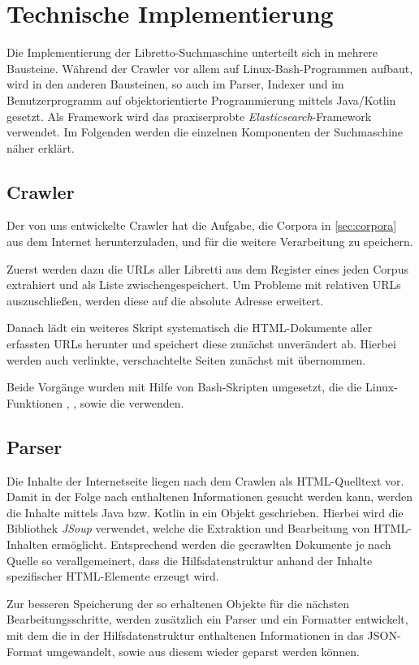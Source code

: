 \section{Technische Implementierung}
Die Implementierung der Libretto-Suchmaschine unterteilt sich
in mehrere Bausteine.
Während der Crawler vor allem auf Linux-Bash-Programmen aufbaut,
wird in den anderen Bausteinen, so auch im Parser, Indexer und im Benutzerprogramm
auf objektorientierte Programmierung mittels Java/Kotlin gesetzt.
Als Framework wird das praxiserprobte \emph{Elasticsearch}-Framework verwendet.
Im Folgenden werden die einzelnen Komponenten der Suchmaschine
näher erklärt.

\subsection{Crawler}
Der von uns entwickelte Crawler hat die Aufgabe,
die Corpora in \ref{sec:corpora} aus dem Internet herunterzuladen,
und für die weitere Verarbeitung zu speichern.

Zuerst werden dazu die URLs aller Libretti aus dem Register
eines jeden Corpus extrahiert und als Liste zwischengespeichert.
Um Probleme mit relativen URLs auszuschließen,
werden diese auf die absolute Adresse erweitert.

Danach lädt ein weiteres Skript systematisch die HTML-Dokumente
aller erfassten URLs herunter
und speichert diese zunächst unverändert ab.
Hierbei werden auch verlinkte, verschachtelte Seiten zunächst mit übernommen.

Beide Vorgänge wurden mit Hilfe von Bash-Skripten umgesetzt,
die die Linux-Funktionen , ,
sowie die  verwenden.

\subsection{Parser}
Die Inhalte der Internetseite liegen nach dem Crawlen
als HTML-Quelltext vor.
Damit in der Folge nach enthaltenen Informationen gesucht werden kann,
werden die Inhalte mittels Java bzw. Kotlin in ein Objekt geschrieben.
Hierbei wird die Bibliothek \emph{JSoup} verwendet,
welche die Extraktion und Bearbeitung von HTML-Inhalten ermöglicht.
Entsprechend werden die gecrawlten Dokumente je nach Quelle
so verallgemeinert, dass die Hilfsdatenstruktur anhand der Inhalte
spezifischer HTML-Elemente erzeugt wird.

Zur besseren Speicherung der so erhaltenen Objekte
für die nächsten Bearbeitungsschritte,
werden zusätzlich ein Parser und ein Formatter entwickelt,
mit dem die in der Hilfsdatenstruktur enthaltenen Informationen
in das JSON-Format umgewandelt,
sowie aus diesem wieder geparst werden können.

